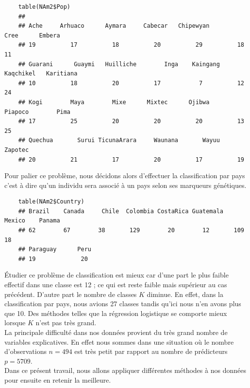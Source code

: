 \documentclass[12pt,a4paper]{article}
\begin{document}
\begin{lstlisting}
	table(NAm2$Pop)
	##
	## Ache     Arhuaco      Aymara     Cabecar   Chipewyan        Cree      Embera 
	## 19          17          18          20          29          18          11 
	## Guarani      Guaymi   Huilliche        Inga    Kaingang   Kaqchikel   Karitiana 
	## 10          18          20          17           7          12          24 
	## Kogi        Maya        Mixe      Mixtec      Ojibwa     Piapoco        Pima 
	## 17          25          20          20          20          13          25 
	## Quechua       Surui TicunaArara     Waunana       Wayuu     Zapotec 
	## 20          21          17          20          17          19 
\end{lstlisting}
Pour palier ce problème, nous décidons alors d'effectuer la classification par
pays c'est à dire qu'un individu sera associé à un pays selon ses marqueurs
génétiques.  
\vspace{2mm}
\begin{lstlisting}
	table(NAm2$Country)
	## Brazil    Canada     Chile  Colombia CostaRica Guatemala    Mexico    Panama 
	## 62        67        38       129        20        12       109        18 
	## Paraguay      Peru 
	## 19             20 
\end{lstlisting}
Étudier ce problème de classification est mieux car d'une part le plus faible
effectif dans une classe est 12 ; ce qui est reste faible mais supérieur au cas
précédent. D'autre part le nombre de classes $K$ diminue. En effet, dans la
classification par pays, nous avions 27 classes tandis qu'ici nous n'en avons
plus que 10. Des méthodes telles que la régression logistique se comporte mieux
lorsque $K$ n'est pas très grand.\vspace{3mm}\\
La principale difficulté dans nos données provient du très grand nombre de variables explicatives. En effet nous sommes dans une situation où le nombre d'observations $n = 494$ est très petit par rapport au nombre de prédicteurs $p=5709$.\\
Dans ce présent travail, nous allons appliquer différentes méthodes à nos données pour ensuite en retenir la meilleure.
\end{document}
